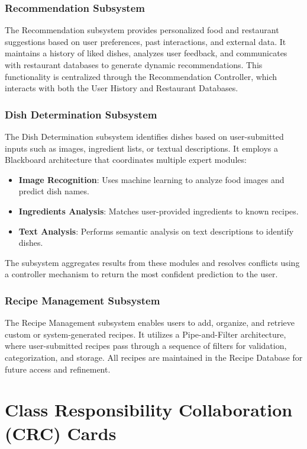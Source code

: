 \documentclass[]{article}
\begin{document}
\subsubsection{Recommendation Subsystem}
The Recommendation subsystem provides personalized food and restaurant suggestions based on user preferences, past interactions, and external data. It maintains a history of liked dishes, analyzes user feedback, and communicates with restaurant databases to generate dynamic recommendations. This functionality is centralized through the Recommendation Controller, which interacts with both the User History and Restaurant Databases.

\subsubsection{Dish Determination Subsystem}
The Dish Determination subsystem identifies dishes based on user-submitted inputs such as images, ingredient lists, or textual descriptions. It employs a Blackboard architecture that coordinates multiple expert modules:
\begin{itemize}
    \item \textbf{Image Recognition}: Uses machine learning to analyze food images and predict dish names.
    \item \textbf{Ingredients Analysis}: Matches user-provided ingredients to known recipes.
    \item \textbf{Text Analysis}: Performs semantic analysis on text descriptions to identify dishes.
\end{itemize}
The subsystem aggregates results from these modules and resolves conflicts using a controller mechanism to return the most confident prediction to the user.

\subsubsection{Recipe Management Subsystem}
The Recipe Management subsystem enables users to add, organize, and retrieve custom or system-generated recipes. It utilizes a Pipe-and-Filter architecture, where user-submitted recipes pass through a sequence of filters for validation, categorization, and storage. All recipes are maintained in the Recipe Database for future access and refinement.



	
\section{Class Responsibility Collaboration (CRC) Cards}
\label{sec:class_responsibility_collaboration_crc_cards}
\end{document}
